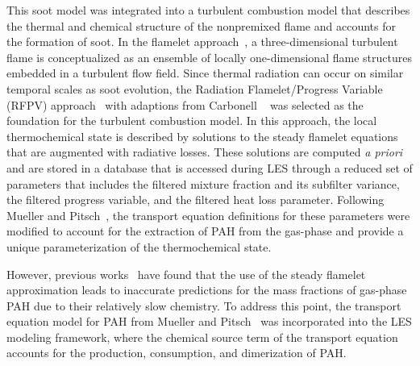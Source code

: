 This soot model was integrated into a turbulent combustion model that describes the thermal and chemical structure of the nonpremixed flame and accounts for the formation of soot. In the flamelet approach~\cite{peters1984}, a three-dimensional turbulent flame is conceptualized as an ensemble of locally one-dimensional flame structures embedded in a turbulent flow field. Since thermal radiation can occur on similar temporal scales as soot evolution, the Radiation Flamelet/Progress Variable (RFPV) approach~\cite{ihme2008} with adaptions from Carbonell \etal~\cite{carbonell2009} was selected as the foundation for the turbulent combustion model. In this approach, the local thermochemical state is described by solutions to the steady flamelet equations that are augmented with radiative losses. These solutions are computed \textit{a priori} and are stored in a database that is accessed during LES through a reduced set of parameters that includes the filtered mixture fraction and its subfilter variance, the filtered progress variable, and the filtered heat loss parameter. Following Mueller and Pitsch~\cite{mueller2012}, the transport equation definitions for these parameters were modified to account for the extraction of PAH from the gas-phase and provide a unique parameterization of the thermochemical state.

However, previous works~\cite{attili2014,bisetti2012} have found that the use of the steady flamelet approximation leads to inaccurate predictions for the mass fractions of gas-phase PAH due to their relatively slow chemistry. To address this point, the transport equation model for PAH from Mueller and Pitsch~\cite{mueller2012} was incorporated into the LES modeling framework, where the chemical source term of the transport equation accounts for the production, consumption, and dimerization of PAH.

